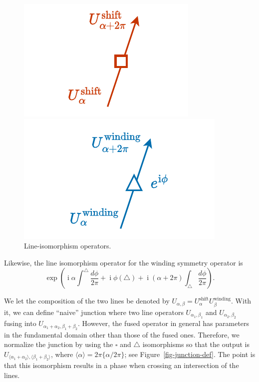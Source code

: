 \documentclass[
  letterpaper,
  DIV=11,
  numbers=noendperiod]{scrreport}
\DeclareMathOperator{\imunit}{i}
\begin{document}
\begin{figure}[t]

\begin{minipage}{0.50\linewidth}
\begin{center}
\includegraphics{figures/shift_2pi_isom.pdf}
\end{center}
\end{minipage}%
%
\begin{minipage}{0.50\linewidth}
\begin{center}
\includegraphics{figures/winding_2pi_isom.pdf}
\end{center}
\end{minipage}%

\caption{\label{fig-line-isom}Line-isomorphism operators.}

\end{figure}%

Likewise, the line isomorphism operator for the winding symmetry
operator is \[
 \exp\left(\imunit \alpha \int^{\triangle} \frac{d\phi}{2\pi} + \imunit\phi(\triangle)  + \imunit (\alpha+2\pi)  \int_{\triangle} \frac{d\phi}{2\pi}  \right).
\]

We let the composition of the two lines be denoted by
\(U_{\alpha,\beta} = U^\text{shift}_\alpha U^\text{winding}_\beta\).
With it, we can define ``naive'' junction where two line operators
\(U_{\alpha_1,\beta_1}\) and \(U_{\alpha_2,\beta_2}\) fusing into
\(U_{\alpha_1+\alpha_2,\beta_1+\beta_2}\). However, the fused operator
in general has parameters in the fundamental domain other than those of
the fused ones. Therefore, we normalize the junction by using the
\(\square\) and \(\triangle\) isomorphisms so that the output is
\(U_{\langle \alpha_1+\alpha_2\rangle, \langle \beta_1+\beta_2\rangle}\),
where \(\langle \alpha \rangle = 2\pi\{\alpha/2\pi\}\); see
Figure~\ref{fig-junction-def}. The point is that this isomorphism
results in a phase when crossing an intersection of the lines.
\end{document}
